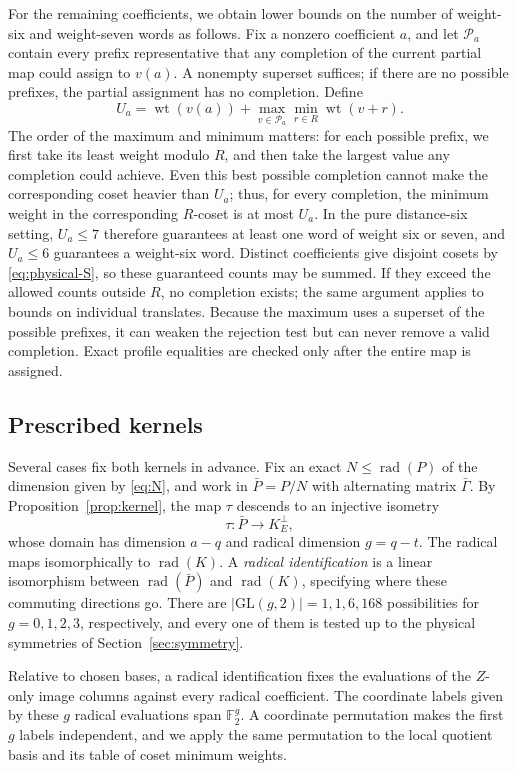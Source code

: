 \documentclass[11pt]{article}
\theoremstyle{definition}
\theoremstyle{remark}
\newcommand{\F}{\mathbb F_2}
\newcommand{\wt}{\operatorname{wt}}
\newcommand{\rad}{\operatorname{rad}}
\begin{document}
For the remaining coefficients, we obtain lower bounds on the number of
weight-six and weight-seven words as follows. Fix a nonzero coefficient
\(a\), and let \(\mathcal P_a\) contain every prefix representative that
any completion of the current partial map could assign to \(v(a)\). A
nonempty superset suffices; if there are no possible prefixes, the
partial assignment has no completion. Define
\[
 U_a=\wt(v(a))+\max_{v\in\mathcal P_a}\min_{r\in R}\wt(v+r).
\]
The order of the maximum and minimum matters: for each possible prefix,
we first take its least weight modulo \(R\), and then take the largest
value any completion could achieve. Even this best possible completion
cannot make the corresponding coset heavier than \(U_a\); thus, for
every completion, the minimum weight in the corresponding \(R\)-coset is
at most \(U_a\). In the pure distance-six setting, \(U_a\leq7\)
therefore guarantees at least one word of weight six or seven, and
\(U_a\leq6\) guarantees a weight-six word. Distinct coefficients give
disjoint cosets by \eqref{eq:physical-S}, so these guaranteed counts may
be summed. If they exceed the allowed counts outside \(R\), no
completion exists; the same argument applies to bounds on individual
translates. Because the maximum uses a superset of the possible
prefixes, it can weaken the rejection test but can never remove a valid
completion. Exact profile equalities are checked only after the entire
map is assigned.

\subsection{Prescribed kernels}\label{sec:fixedkernel}

Several cases fix both kernels in advance. Fix an exact
\(N\leq\rad(P)\) of the dimension given by \eqref{eq:N}, and work in
\(\bar P=P/N\) with alternating matrix \(\bar\Gamma\). By
Proposition~\ref{prop:kernel}, the map \(\tau\) descends to an injective
isometry
\[
 \tau:\bar P\longrightarrow K^\perp_E,
\]
whose domain has dimension \(a-q\) and radical dimension \(g=q-t\). The
radical maps isomorphically to \(\rad(K)\). A \emph{radical
identification} is a linear isomorphism between \(\rad(\bar P)\) and
\(\rad(K)\), specifying where these commuting directions go. There are
\(|\mathrm{GL}(g,2)|=1,1,6,168\) possibilities for \(g=0,1,2,3\),
respectively, and every one of them is tested up to the physical
symmetries of Section~\ref{sec:symmetry}.

Relative to chosen bases, a radical identification fixes the evaluations
of the \(Z\)-only image columns against every radical coefficient. The
coordinate labels given by these \(g\) radical evaluations span
\(\F^g\). A coordinate permutation makes the first \(g\) labels
independent, and we apply the same permutation to the local quotient
basis and its table of coset minimum weights.
\end{document}
